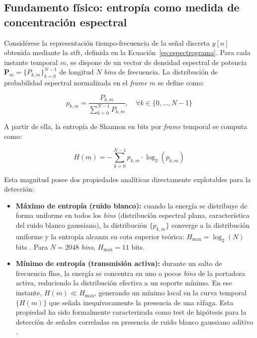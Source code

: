 \subsection{Fundamento físico: entropía como medida de concentración espectral}
\label{subsec:fundamento_entropia}

Considérese la representación tiempo-frecuencia de la señal discreta $y[n]$ obtenida mediante la {\gls{stft}}, definida en la Ecuación~\ref{eq:espectrograma}. Para cada instante temporal $m$, se dispone de un vector de densidad espectral de potencia $\mathbf{P}_m = \{P_{k,m}\}_{k=0}^{N-1}$ de longitud $N$ \textit{bins} de frecuencia. La distribución de probabilidad espectral normalizada en el \textit{frame} $m$ se define como:

\begin{equation}
    p_{k,m} = \frac{P_{k,m}}{\displaystyle\sum_{k=0}^{N-1} P_{k,m}}, \quad \forall k \in \{0, \ldots, N-1\}
    \label{eq:prob_espectral}
\end{equation}

A partir de ella, la entropía de Shannon en bits por \textit{frame} temporal se computa como:

\begin{equation}
    H(m) = -\sum_{k=0}^{N-1} p_{k,m} \cdot \log_2\!\left(p_{k,m}\right)
    \label{eq:entropia_shannon}
\end{equation}

Esta magnitud posee dos propiedades analíticas directamente explotables para la detección:

\begin{itemize}\itemsep 0em
    \item \textbf{Máximo de entropía (ruido blanco):} cuando la energía se distribuye de forma uniforme en todos los \textit{bins} (distribución espectral plana, característica del ruido blanco gaussiano), la distribución $\{p_{k,m}\}$ converge a la distribución uniforme y la entropía alcanza su cota superior teórica: $H_{\max} = \log_2(N)$ bits \cite{cover_elements_2006}. Para $N = 2048$ \textit{bins}, $H_{\max} = 11$ bits.

    \item \textbf{Mínimo de entropía (transmisión activa):} durante un salto de frecuencia \gls{fhss}, la energía se concentra en uno o pocos \textit{bins} de la portadora activa, reduciendo la distribución efectiva a un soporte mínimo. En ese instante, $H(m) \ll H_{\max}$, generando un mínimo local en la curva temporal $\{H(m)\}$ que señala inequívocamente la presencia de una ráfaga. Esta propiedad ha sido formalmente caracterizada como test de hipótesis para la detección de señales correladas en presencia de ruido blanco gaussiano aditivo \cite{zhang_entropy-based_1989}.
\end{itemize}

